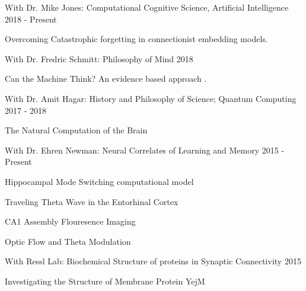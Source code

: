 \begin{cventries}

  \cvrpentry
    {With Dr. Mike Jones: Computational Cognitive Science, Artificial Intelligence} %
    {} %
    {} %
    {2018 - Present} %
    {
      \begin{cvitems} %
        \item {Overcoming Catastrophic forgetting in connectionist embedding models.}
      \end{cvitems}
    }

\cvrpentry
    {With Dr. Fredric Schmitt: Philosophy of Mind} %
    {} %
    {} %
    {2018} %
    {
      \begin{cvitems} %
        \item {Can the Machine Think? An evidence based approach .}
      \end{cvitems}
    }

\cvrpentry
    {With Dr. Amit Hagar: History and Philosophy of Science; Quantum Computing} %
    {} %
    {} %
    {2017 - 2018 } %
    {
      \begin{cvitems} %
        \item {The Natural Computation of the Brain}
      \end{cvitems}
    }

\cvrpentry
    {With Dr. Ehren Newman: Neural Correlates of Learning and Memory} %
    {} %
    {} %
    {2015 - Present } %
    {
      \begin{cvitems} %
        \item {Hippocampal Mode Switching computational model}
	\item{Traveling Theta Wave in the Entorhinal Cortex}
	\item{CA1 Assembly Flouresence Imaging}
	\item{Optic Flow and Theta Modulation}
      \end{cvitems}
    }

\cvrpentry
    {With Ressl Lab: Biochemical Structure of proteins in Synaptic Connectivity} %
    {} %
    {} %
    {2015} %
    {
      \begin{cvitems} %
        \item {Investigating the Structure of Membrane Protein YejM}
      \end{cvitems}
    }


\end{cventries}
